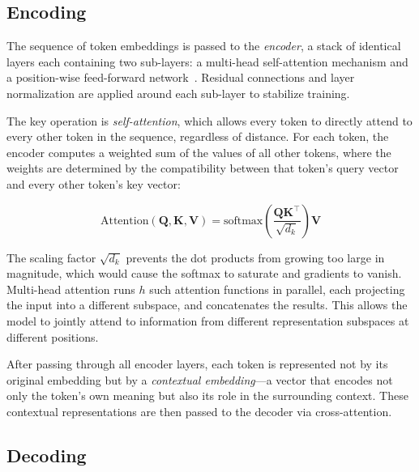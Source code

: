 \subsection{Encoding}

The sequence of token embeddings is passed to the \emph{encoder}, a stack of identical layers each containing two sub-layers: a multi-head self-attention mechanism and a position-wise feed-forward network~\cite{vaswani2017attention}. Residual connections and layer normalization are applied around each sub-layer to stabilize training.

The key operation is \emph{self-attention}, which allows every token to directly attend to every other token in the sequence, regardless of distance. For each token, the encoder computes a weighted sum of the values of all other tokens, where the weights are determined by the compatibility between that token's query vector and every other token's key vector:

\begin{equation}
  \text{Attention}(\mathbf{Q}, \mathbf{K}, \mathbf{V})
  = \text{softmax}\!\left(\frac{\mathbf{Q}\mathbf{K}^{\top}}{\sqrt{d_k}}\right)\mathbf{V}
\end{equation}

\noindent The scaling factor $\sqrt{d_k}$ prevents the dot products from growing too large in magnitude, which would cause the softmax to saturate and gradients to vanish. Multi-head attention runs $h$ such attention functions in parallel, each projecting the input into a different subspace, and concatenates the results. This allows the model to jointly attend to information from different representation subspaces at different positions.

After passing through all encoder layers, each token is represented not by its original embedding but by a \emph{contextual embedding}---a vector that encodes not only the token's own meaning but also its role in the surrounding context. These contextual representations are then passed to the decoder via cross-attention.

\subsection{Decoding}

